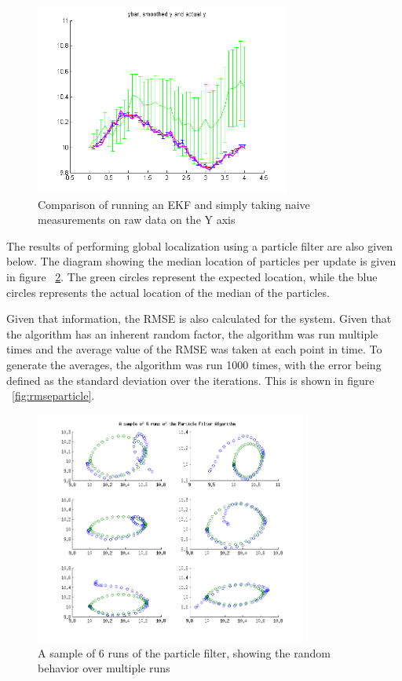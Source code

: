 \documentclass[english]{article}
\begin{document}
\begin{figure}[htp]
\centering
 \includegraphics[width=0.75\textwidth]{images/yybar.png}
\caption{Comparison of running an EKF and simply taking naive measurements on raw data on the Y axis}
\label{fig:yybar}
\end{figure}

The results of performing global localization using a particle filter are also given below. The diagram showing the median location of particles per update is given in figure ~\ref{fig:particle}. The green circles represent the expected location, while the blue circles represents the actual location of the median of the particles.

Given that information, the RMSE is also calculated for the system. Given that the algorithm has an inherent random factor, the algorithm was run multiple times and the average value of the RMSE was taken at each point in time. To generate the averages, the algorithm was run 1000 times, with the error being defined as the standard deviation over the iterations. This is shown in figure ~\ref{fig:rmseparticle}. 

\begin{figure}[htp]
\centering
 \includegraphics[width=0.8\textwidth]{images/particlefilter.png}
\caption{A sample of 6 runs of the particle filter, showing the random behavior over multiple runs}
\label{fig:particle}
\end{figure}
\end{document}
